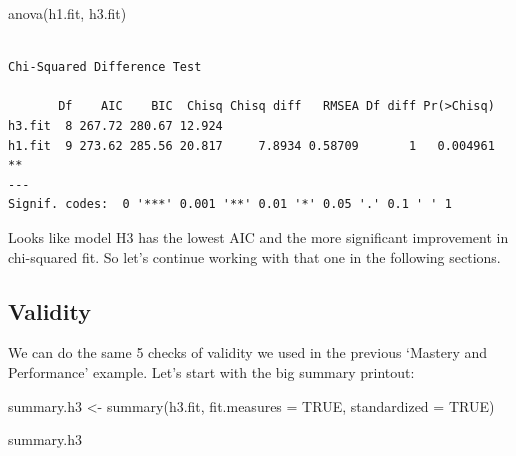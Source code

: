 \documentclass[
  letterpaper,
  DIV=11,
  numbers=noendperiod]{scrreprt}
\newenvironment{Shaded}{\begin{snugshade}}{\end{snugshade}}
\newcommand{\AttributeTok}[1]{\textcolor[rgb]{0.40,0.45,0.13}{#1}}
\newcommand{\ConstantTok}[1]{\textcolor[rgb]{0.56,0.35,0.01}{#1}}
\newcommand{\FunctionTok}[1]{\textcolor[rgb]{0.28,0.35,0.67}{#1}}
\newcommand{\NormalTok}[1]{\textcolor[rgb]{0.00,0.23,0.31}{#1}}
\newcommand{\OtherTok}[1]{\textcolor[rgb]{0.00,0.23,0.31}{#1}}
\begin{document}
\begin{Shaded}
\begin{Highlighting}[]
\FunctionTok{anova}\NormalTok{(h1.fit, h3.fit)}
\end{Highlighting}
\end{Shaded}

\begin{verbatim}

Chi-Squared Difference Test

       Df    AIC    BIC  Chisq Chisq diff   RMSEA Df diff Pr(>Chisq)   
h3.fit  8 267.72 280.67 12.924                                         
h1.fit  9 273.62 285.56 20.817     7.8934 0.58709       1   0.004961 **
---
Signif. codes:  0 '***' 0.001 '**' 0.01 '*' 0.05 '.' 0.1 ' ' 1
\end{verbatim}

Looks like model H3 has the lowest AIC and the more significant
improvement in chi-squared fit. So let's continue working with that one
in the following sections.

\hypertarget{validity}{%
\subsection*{Validity}\label{validity}}

We can do the same 5 checks of validity we used in the previous `Mastery
and Performance' example. Let's start with the big summary printout:

\begin{Shaded}
\begin{Highlighting}[]
\NormalTok{summary.h3 }\OtherTok{\textless{}{-}} \FunctionTok{summary}\NormalTok{(h3.fit, }\AttributeTok{fit.measures =} \ConstantTok{TRUE}\NormalTok{, }\AttributeTok{standardized =} \ConstantTok{TRUE}\NormalTok{)}

\NormalTok{summary.h3}
\end{Highlighting}
\end{Shaded}
\end{document}
